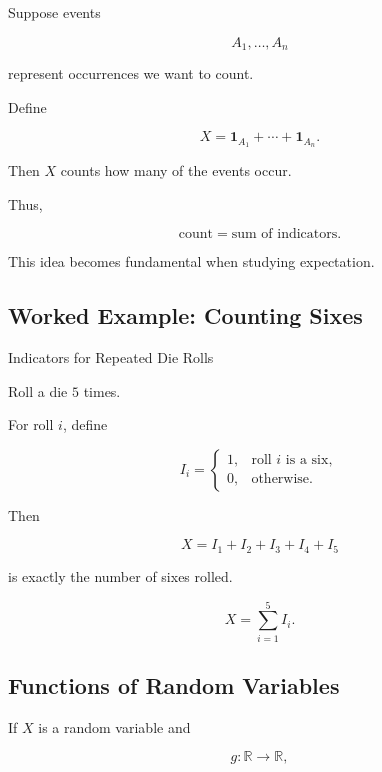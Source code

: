 Suppose events

\[
A_1,\ldots,A_n
\]

represent occurrences we want to count.

Define

\[
X
=
\mathbf{1}_{A_1}
+\cdots+
\mathbf{1}_{A_n}.
\]

Then \(X\) counts how many of the events occur.

Thus,

\[
\boxed{
\text{count}
=
\text{sum of indicators}.
}
\]

This idea becomes fundamental when studying expectation.

\subsection{Worked Example: Counting Sixes}
\label{subsec:worked-indicator-sixes}

\begin{workedexamplebox}{Indicators for Repeated Die Rolls}

Roll a die \(5\) times.

For roll \(i\), define

\[
I_i
=
\begin{cases}
1,&\text{roll \(i\) is a six},\\
0,&\text{otherwise}.
\end{cases}
\]

Then

\[
X
=
I_1+I_2+I_3+I_4+I_5
\]

is exactly the number of sixes rolled.

\begin{answerbox}
\[
\boxed{
X=\sum_{i=1}^{5}I_i.
}
\]
\end{answerbox}

\end{workedexamplebox}

\subsection{Functions of Random Variables}
\label{subsec:functions-of-random-variables}

If \(X\) is a random variable and

\[
g:\mathbb{R}\to\mathbb{R},
\]

